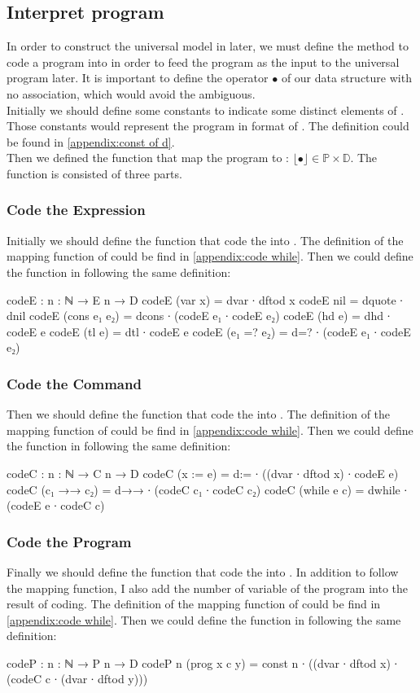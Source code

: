 \subsection{Interpret \WHILE program}
In order to construct the universal \WHILE model in \Agda later, we must define the method to code a program into  in order to feed the program as the input to the universal \WHILE program later.
It is important to define the operator $\bullet$ of our data structure  with no association, which would avoid the ambiguous.\\
Initially we should define some constants to indicate some distinct elements of .
Those constants would represent the program in format of .
The definition could be found in \ref{appendix:const of d}.\\
Then we defined the function that map the program to : $\lfloor\bullet\rfloor \in \mathds{P} \times \mathds{D}$.
The  function is consisted of three parts.
\subsubsection{Code the Expression}
Initially we should define the function that code the  into .
The definition of the mapping function of  could be find in \ref{appendix:code while}.
Then we could define the function in \Agda following the same definition:
\begin{code}
codeE : {n : ℕ} → E n → D
codeE (var x) = dvar ∙ dftod x
codeE nil = dquote ∙ dnil
codeE (cons e₁ e₂) = dcons ∙ (codeE e₁ ∙ codeE e₂)
codeE (hd e) = dhd ∙ codeE e
codeE (tl e) = dtl ∙ codeE e
codeE (e₁ =? e₂) = d=? ∙ (codeE e₁ ∙ codeE e₂)
\end{code}
\subsubsection{Code the Command}
Then we should define the function that code the  into .
The definition of the mapping function of  could be find in \ref{appendix:code while}.
Then we could define the function in \Agda following the same definition:
\begin{code}
codeC : {n : ℕ} → C n → D
codeC (x := e) = d:= ∙ ((dvar ∙ dftod x) ∙ codeE e)
codeC (c₁ →→ c₂) = d→→ ∙ (codeC c₁ ∙ codeC c₂)
codeC (while e c) = dwhile ∙ (codeE e ∙ codeC c)
\end{code}
\subsubsection{Code the Program}
Finally we should define the function that code the  into .
In addition to follow the mapping function, I also add the number of variable of the program into the result of coding.
The definition of the mapping function of  could be find in \ref{appendix:code while}.
Then we could define the function in \Agda following the same definition:
\begin{code}
codeP : {n : ℕ} → P n → D
codeP {n} (prog x c y) = const n ∙ ((dvar ∙ dftod x) ∙
                                    (codeC c ∙
                                    (dvar ∙ dftod y)))
\end{code}
